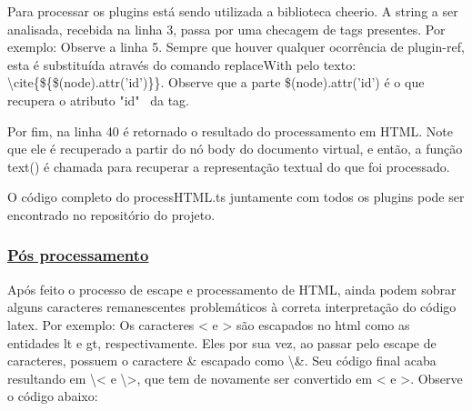 
Para processar os plugins está sendo utilizada a biblioteca cheerio.
A string a ser analisada, recebida na linha 3, passa por uma checagem de
tags presentes. Por exemplo: Observe a linha 5. Sempre que houver
qualquer ocorrência de plugin-ref, esta é substituída através do
comando replaceWith pelo texto:
\textbackslash cite\{\$\{\$(node).attr('id')\}\}.
Observe que a parte \$(node).attr('id')
é o que recupera o atributo "id"~  da tag.

\begin{processHTML}
import * as cheerio from 'cheerio';

export function processHTML(text: string): string{
    const $ = cheerio.load(text);
    $('plugin-ref').replaceWith((_, node) => {
        return `\\cite{${$(node).attr('id')}}`;
    }); [...]
\end{processHTML}

Por fim, na linha 40 é retornado o resultado do processamento
em HTML. Note que ele é recuperado a partir do nó body do documento
virtual, e então, a função text() é chamada para recuperar a
representação textual do que foi processado.

\begin{processHTML2}
[...]
    return $('body').text();
}
\end{processHTML2}

O código completo do processHTML.ts juntamente com
todos os plugins pode ser encontrado no repositório do projeto.

\subsubsection{\underline{Pós processamento}}

Após feito o processo de escape e processamento de HTML, ainda podem
sobrar alguns caracteres remanescentes problemáticos à correta
interpretação do código
\acrshort{latex}.
Por exemplo: Os caracteres < e > são escapados no
\acrshort{html}
como as entidades lt e gt, respectivamente. Eles por sua vez,
ao passar pelo escape de caracteres, possuem o caractere
\& escapado como \textbackslash \&. Seu código final acaba resultando em
\textbackslash < e \textbackslash >, que tem de novamente ser convertido em
< e >.
Observe o código abaixo:


